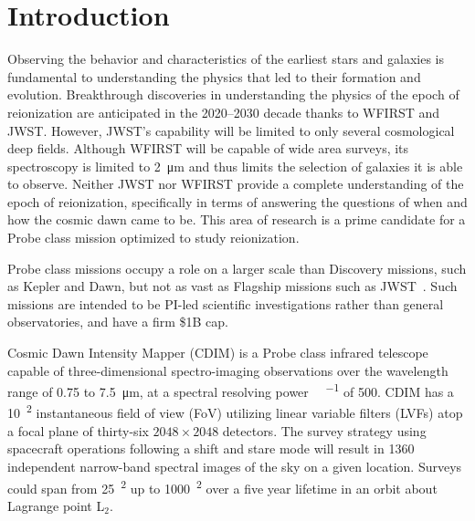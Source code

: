 \documentclass{ws-jai}
\begin{document}
\section{Introduction}
\label{sec:introduction}
Observing the behavior and characteristics of the earliest stars and galaxies is fundamental to understanding the physics that led to their formation and evolution.
Breakthrough discoveries in understanding the physics of the epoch of reionization are anticipated in the 2020--2030 decade thanks to WFIRST and JWST\@.
However, JWST's capability will be limited to only several cosmological deep fields.
Although WFIRST will be capable of wide area surveys, its spectroscopy is limited to \SI{2}{\micro\meter} and thus limits the selection of galaxies it is able to observe.
Neither JWST nor WFIRST provide a complete understanding of the epoch of reionization, specifically in terms of answering the questions of when and how the cosmic dawn came to be.
This area of research is a prime candidate for a Probe class mission optimized to study reionization.


Probe class missions occupy a role on a larger scale than Discovery missions, such as Kepler and Dawn, but not as vast as Flagship missions such as JWST~\cite{probeclasswp}.
Such missions are intended to be PI-led scientific investigations rather than general observatories, and have a firm \$1B cap.

Cosmic Dawn Intensity Mapper (CDIM) is a Probe class infrared telescope capable of three-dimensional spectro-imaging observations over the wavelength range of 0.75 to \SI{7.5}{\micro\meter}, at a spectral resolving power \si{\Delta\lambda\per\lambda} of 500.
CDIM has a \SI{10}{\deg\squared} instantaneous field of view (FoV) utilizing linear variable filters (LVFs) atop a focal plane of thirty-six $2048\times2048$ detectors.
The survey strategy using spacecraft operations following a shift and stare mode will result in 1360 independent narrow-band spectral images of the sky on a given location.
Surveys could span from \SI{25}{\deg\squared} up to \SI{1000}{\deg\squared} over a five year lifetime in an orbit about Lagrange point L$_{2}$\@.
\end{document}
